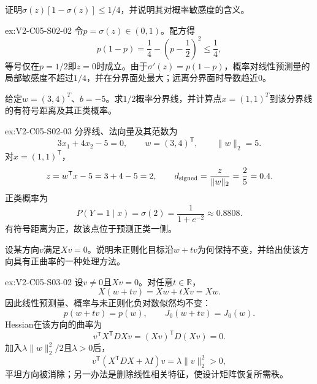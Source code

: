 \begin{SLChapterExercisePairSection}
\begin{exercise}\label{ex:V2-C05-S02-02}
证明$\sigma(z)[1-\sigma(z)]\leq1/4$，并说明其对概率敏感度的含义。
\end{exercise}
\ifSLFullEdition
{}\label{sol:V2-C05-S02-02}
\begin{chapterexercisesolution}{ex:V2-C05-S02-02}
令$p=\sigma(z)\in(0,1)$。配方得
\[
p(1-p)=\frac14-\left(p-\frac12\right)^2\leq\frac14,
\]
等号仅在$p=1/2$即$z=0$时成立。由于$\sigma'(z)=p(1-p)$，概率对线性预测量的局部敏感度不超过$1/4$，并在分界面处最大；远离分界面时导数趋近0。
\end{chapterexercisesolution}
\fi

\begin{exercise}\label{ex:V2-C05-S02-03}
给定$w=(3,4)^T$、$b=-5$。求$1/2$概率分界线，并计算点$x=(1,1)^T$到该分界线的有符号距离及其正类概率。
\end{exercise}
\ifSLFullEdition
{}\label{sol:V2-C05-S02-03}
\begin{chapterexercisesolution}{ex:V2-C05-S02-03}
分界线、法向量及其范数为
\[
3x_1+4x_2-5=0,
\qquad
w=(3,4)^{\mathsf T},
\qquad
\lVert w\rVert_2=5.
\]
对$x=(1,1)^{\mathsf T}$，
\[
z=w^{\mathsf T}x-5=3+4-5=2,
\qquad
d_{\rm signed}=\frac{z}{\lVert w\rVert_2}=\frac25=0.4.
\]
正类概率为
\[
P(Y=1\mid x)=\sigma(2)=\frac1{1+e^{-2}}\approx0.8808.
\]
有符号距离为正，故该点位于预测正类一侧。
\end{chapterexercisesolution}
\fi

\begin{exercise}\label{ex:V2-C05-S03-02}
设某方向$v$满足$Xv=0$。说明未正则化目标沿$w+tv$为何保持不变，并给出使该方向具有正曲率的一种处理方法。
\end{exercise}
\ifSLFullEdition
{}\label{sol:V2-C05-S03-02}
\begin{chapterexercisesolution}{ex:V2-C05-S03-02}
设$v\neq0$且$Xv=0$。对任意$t\in\mathbb R$，
\[
X(w+tv)=Xw+tXv=Xw.
\]
因此线性预测量、概率与未正则化负对数似然均不变：
\[
p(w+tv)=p(w),
\qquad
J_0(w+tv)=J_0(w).
\]
Hessian在该方向的曲率为
\[
v^{\mathsf T}X^{\mathsf T}DXv
=(Xv)^{\mathsf T}D(Xv)=0.
\]
加入$\lambda\lVert w\rVert_2^2/2$且$\lambda>0$后，
\[
v^{\mathsf T}(X^{\mathsf T}DX+\lambda I)v
=\lambda\lVert v\rVert_2^2>0,
\]
平坦方向被消除；另一办法是删除线性相关特征，使设计矩阵恢复所需秩。
\end{chapterexercisesolution}
\fi


\end{SLChapterExercisePairSection}
